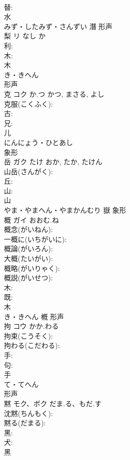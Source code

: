 \documentclass[8pt]{extreport}
\begin{document}
\begin{CJK}{UTF8}{min}
\\	替: 
\\	水	
\\	みず・したみず・さんずい	潛	形声 
\\	梨	リ	なし	か	
\\	利: 
\\	木: 
\\	木	
\\	き・きへん	
\\	形声 
\\	克	コク	か.つ	かつ, まさる, よし	
\\	克服(こくふく): 
\\	古: 
\\	兄: 
\\	儿	
\\	にんにょう・ひとあし	
\\	象形 
\\	岳	ガク	たけ	おか, たか, たけん	
\\	山岳(さんがく): 
\\	丘: 
\\	山: 
\\	山	
\\	やま・やまへん・やまかんむり	嶽	象形 
\\	概	ガイ	おおむ.ね		
\\	概念(がいねん): 
\\	一概に(いちがいに): 
\\	概論(がいろん): 
\\	大概(たいがい): 
\\	概略(がいりゃく): 
\\	概説(がいせつ): 
\\	木: 
\\	既: 
\\	木	
\\	き・きへん	槪	形声 
\\	拘	コウ	かか.わる		
\\	拘束(こうそく): 
\\	拘わる(こだわる): 
\\	手: 
\\	句: 
\\	手	
\\	て・てへん	
\\	形声 
\\	黙	モク、ボク	だま.る、もだ.す		
\\	沈黙(ちんもく): 
\\	黙る(だまる): 
\\	黑: 
\\	犬: 
\\	黑	

\end{CJK}
\end{document}
